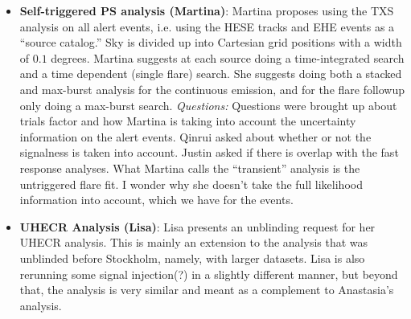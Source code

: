 \begin{itemize}
    \item \textbf{Self-triggered PS analysis (Martina)}: Martina proposes using the TXS analysis on all alert events, i.e. using the HESE tracks and EHE events as a ``source catalog.'' Sky is divided up into Cartesian grid positions with a width of $0.1$ degrees. Martina suggests at each source doing a time-integrated search and a time dependent (single flare) search. She suggests doing both a stacked and max-burst analysis for the continuous emission, and for the flare followup only doing a max-burst search. \emph{Questions:} Questions were brought up about trials factor and how Martina is taking into account the uncertainty information on the alert events. Qinrui asked about whether or not the signalness is taken into account. Justin asked if there is overlap with the fast response analyses. What Martina calls the ``transient'' analysis is the untriggered flare fit. I wonder why she doesn't take the full likelihood information into account, which we have for the events.
    \item \textbf{UHECR Analysis (Lisa)}: Lisa presents an unblinding request for her UHECR analysis. This is mainly an extension to the analysis that was unblinded before Stockholm, namely, with larger datasets. Lisa is also rerunning some signal injection(?) in a slightly different manner, but beyond that, the analysis is very similar and meant as a complement to Anastasia's analysis.
\end{itemize}

